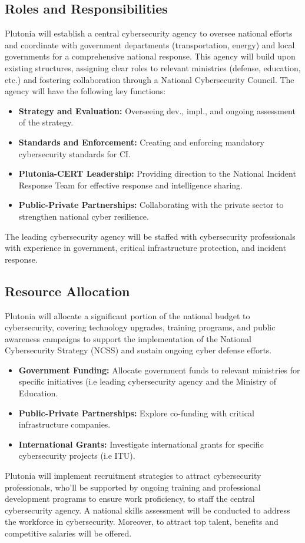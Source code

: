 \documentclass[
	a4paper, %
	10pt, %
]{CSSullivanBusinessReport}
\begin{document}
\begin{fullwidth}
\begin{justify}
\subsection{Roles and Responsibilities}
Plutonia will establish a central cybersecurity agency to oversee national efforts and coordinate with government departments (transportation, energy) and local governments for a comprehensive national response. This agency will build upon existing structures, assigning clear roles to relevant ministries (defense, education, etc.) and fostering collaboration through a National Cybersecurity Council.
The agency will have the following key functions:
\begin{itemize}
	\item \textbf{Strategy and Evaluation:} Overseeing dev., impl., and ongoing assessment of the strategy.
	\item \textbf{Standards and Enforcement:} Creating and enforcing mandatory cybersecurity standards for CI.
	\item \textbf{Plutonia-CERT Leadership:} Providing direction to the National Incident Response Team for effective response and intelligence sharing.
	\item \textbf{Public-Private Partnerships:} Collaborating with the private sector to strengthen national cyber resilience.
\end{itemize}
The leading cybersecurity agency will be staffed with cybersecurity professionals with experience in government, critical infrastructure protection, and incident response.

\subsection{Resource Allocation}
Plutonia will allocate a significant portion of the national budget to cybersecurity, covering technology upgrades, training programs, and public awareness campaigns to support the implementation of the National Cybersecurity Strategy (NCSS) and sustain ongoing cyber defense efforts. 
\begin{itemize}
	\item \textbf{Government Funding:} Allocate government funds to relevant ministries for specific initiatives (i.e leading cybersecurity agency and the Ministry of Education.
	\item \textbf{Public-Private Partnerships:} Explore co-funding with critical infrastructure companies.
	\item \textbf{International Grants:} Investigate international grants for specific cybersecurity projects (i.e ITU).
\end{itemize}
Plutonia will implement recruitment strategies to attract cybersecurity professionals, who’ll be supported by ongoing training and professional development programs to ensure work proficiency, to staff the central cybersecurity agency. A national skills assessment will be conducted to address the workforce in cybersecurity. Moreover, to attract top talent, benefits and competitive salaries will be offered. 


\end{justify}
\end{fullwidth}
\end{document}

